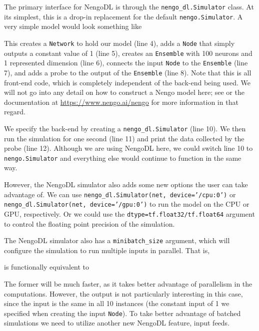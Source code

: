 \documentclass{article}
\begin{document}
The primary interface for NengoDL is through the \texttt{nengo\_dl.Simulator} class.  At its simplest, this is a drop-in replacement for the default \texttt{nengo.Simulator}.  A very simple model would look something like

\lstset{language=Python, numbers=left, columns=fixed, basicstyle=\ttfamily}


This creates a \texttt{Network} to hold our model (line 4), adds a \texttt{Node} that simply outputs a constant value of 1 (line 5), creates an \texttt{Ensemble} with 100 neurons and 1 represented dimension (line 6), connects the input \texttt{Node} to the \texttt{Ensemble} (line 7), and adds a probe to the output of the \texttt{Ensemble} (line 8).  Note that this is all front-end code, which is completely independent of the back-end being used.  We will not go into any detail on how to construct a Nengo model here; see \citet{Bekolay2014} or the documentation at \url{https://www.nengo.ai/nengo} for more information in that regard.

We specify the back-end by creating a \texttt{nengo\_dl.Simulator} (line 10).  We then run the simulation for one second (line 11) and print the data collected by the probe (line 12).  Although we are using NengoDL here, we could switch line 10 to \texttt{nengo.Simulator} and everything else would continue to function in the same way.

However, the NengoDL simulator also adds some new options the user can take advantage of.  We can use \texttt{nengo\_dl.Simulator(net, device='/cpu:0')} or \texttt{nengo\_dl.Simulator(net, device='/gpu:0')} to run the model on the CPU or GPU, respectively.  Or we could use the \texttt{dtype=tf.float32/tf.float64} argument to control the floating point precision of the simulation.

The NengoDL simulator also has a \texttt{minibatch\_size} argument, which will configure the simulation to run multiple inputs in parallel.  That is,

\lstset{numbers=none}


is functionally equivalent to



The former will be much faster, as it takes better advantage of parallelism in the computations.  However, the output is not particularly interesting in this case, since the input is the same in all 10 instances (the constant input of 1 we specified when creating the input \texttt{Node}).  To take better advantage of batched simulations we need to utilize another new NengoDL feature, input feeds.
\end{document}
